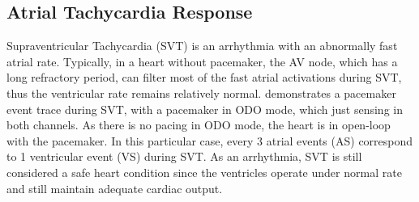 \subsection{Atrial Tachycardia Response}

Supraventricular Tachycardia (SVT) is an arrhythmia with an abnormally fast atrial rate. %
Typically, in a heart without pacemaker, the AV node, which has a long refractory period, can filter most of the fast atrial activations during SVT, thus the ventricular rate remains relatively normal.  demonstrates a pacemaker event trace during SVT, with a pacemaker in ODO mode, which just sensing in both channels. 
As there is no pacing in ODO mode, the heart is in open-loop with the pacemaker. In this particular case, every 3 atrial events (AS) correspond to 1 ventricular event (VS) during SVT. 
As an arrhythmia, SVT is still considered a safe heart condition since the ventricles operate under normal rate and still maintain adequate cardiac output. 

